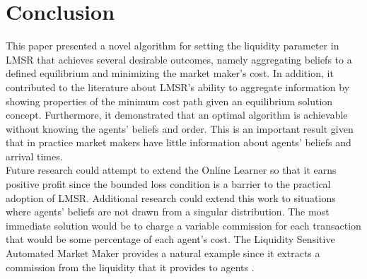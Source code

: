 \section{Conclusion}
This paper presented a novel algorithm for setting the liquidity parameter in LMSR that achieves several desirable outcomes, namely aggregating beliefs to a defined equilibrium and minimizing the market maker's cost. In addition, it contributed to the literature about LMSR's ability to aggregate information by showing properties of the minimum cost path given an equilibrium solution concept. Furthermore, it demonstrated that an optimal algorithm
is achievable without knowing the agents' beliefs and order. This is an important result
given that in practice market makers have little information about agents' beliefs and
arrival times. \\

Future research could attempt to extend the Online Learner so that it earns positive profit since the bounded loss condition is a barrier to the practical adoption of LMSR. Additional research could extend this work to situations where agents' beliefs are not drawn from a singular distribution. The most immediate solution would be to charge a variable commission for each transaction that would be some percentage of each agent's cost. The Liquidity Sensitive Automated Market Maker provides a natural example since it extracts a commission from the liquidity that it provides to agents \cite{Othman:2013:PLA:2509413.2509414}.